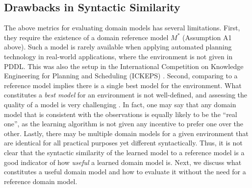 \documentclass{article}
\theoremstyle{definition}
\theoremstyle{remark}
\newcommand{\realm}{{\ensuremath{M^*}}\xspace}
\newif\ifaddcomments
\newcommand{\roni}[1]{\ifaddcomments{\textcolor{red}{[Roni: #1]}}\fi}
\newcommand{\gregor}[1]{\ifaddcomments{\textcolor{orange}{[Gregor: #1]}}\fi}
\begin{document}
\subsection{Drawbacks in Syntactic Similarity}
The above metrics for evaluating domain models has several limitations. 
First, they require the existence of a domain reference model $\realm$ (Assumption A1 above). Such a model is rarely available when applying automated planning technology in real-world applications, where the environment is not given in PDDL. 
This was also the setup in the International Competition on Knowledge Engineering for Planning and Scheduling (ICKEPS) \citep{DBLP:journals/aim/ChrpaMVV17}. 
Second, comparing to a reference model implies there is a single best model for the environment. 
What constitutes a \emph{best model} for an environment is not well-defined, and assessing the quality of a model is very challenging \citep{DBLP:conf/kcap/McCluskeyVV17}. 
In fact, one may say that any domain model that is consistent with the observations is equally likely to be the ``real one'', as the learning algorithm is not given any incentive to prefer one over the other. \roni{@Pascal and Gregor: is this sentence capturing what you wrote about in the comment below?}
Lastly, there may be multiple domain models for a given environment that are identical for all practical purposes yet different syntactically. 
Thus, it is not clear that the syntactic similarity of the learned model to a reference model is a good indicator of how \emph{useful} a learned domain model is. 
Next, we discuss what constitutes a useful domain model and how to evaluate it without the need for a reference domain model.


\end{document}
